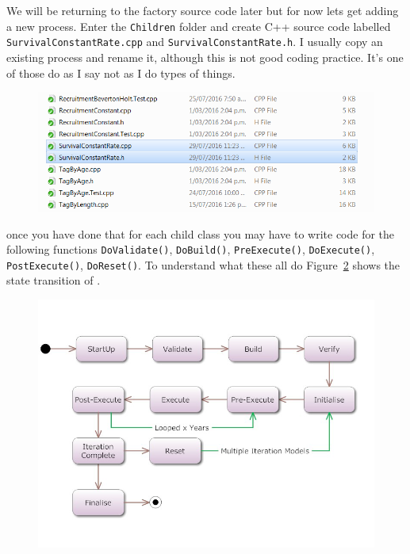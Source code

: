 We will be returning to the factory source code later but for now lets get adding a new process. Enter the \texttt{Children} folder and create C++ source code labelled \texttt{SurvivalConstantRate.cpp} and \texttt{SurvivalConstantRate.h}. I usually copy an existing process and rename it, although this is not good coding practice. It's one of those do as I say not as I do types of things.
\begin{figure}[!ht]
	\centering
	\includegraphics[scale=0.6]{Figures/add_survival.png}
	\caption{}\label{fig:process2}
\end{figure}

once you have done that for each child class you may have to write code for the following functions \texttt{DoValidate()}, \texttt{DoBuild()}, \texttt{PreExecute()}, \texttt{DoExecute()}, \texttt{PostExecute()}, \texttt{DoReset()}. To understand what these all do Figure~\ref{fig:flow} shows the state transition of \CNAME.
\raggedbottom
\begin{figure}[!ht]
	\centering
	\includegraphics[scale=0.6]{Figures/State-Transition.png}
	\caption{}\label{fig:flow}
\end{figure}

